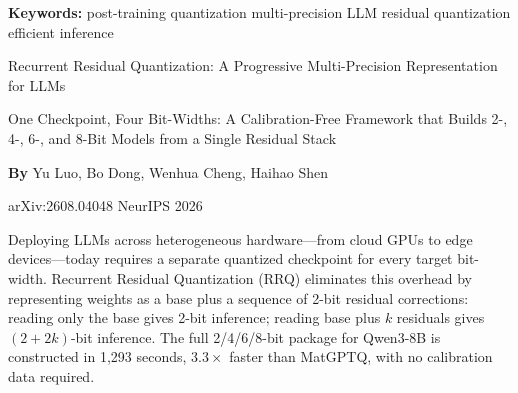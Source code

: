 \documentclass[10pt,twocolumn]{article}
\begin{document}
\setlength{\parindent}{0pt}
\setlength{\parskip}{4pt}

{\small\color{keywordgray}\textbf{Keywords:}
  post-training quantization \textbullet{}
  multi-precision LLM \textbullet{}
  residual quantization \textbullet{}
  efficient inference}\par\vspace{4pt}

{\LARGE\bfseries\raggedright
  Recurrent Residual Quantization: A Progressive
  Multi-Precision Representation for LLMs}\par\vspace{4pt}

{\large\itshape\raggedright
  One Checkpoint, Four Bit-Widths: A Calibration-Free
  Framework that Builds 2-, 4-, 6-, and 8-Bit Models
  from a Single Residual Stack}\par\vspace{6pt}

{\small\textbf{By} Yu Luo, Bo Dong, Wenhua Cheng, Haihao Shen}\par\vspace{2pt}

{\small\color{keywordgray}arXiv:2608.04048 \textbullet{} NeurIPS 2026}
\par\vspace{2pt}\noindent{\color{rulered}\rule{\columnwidth}{0.6pt}}\vspace{6pt}

Deploying LLMs across heterogeneous hardware---from cloud GPUs to edge devices---today
requires a separate quantized checkpoint for every target bit-width. Recurrent Residual
Quantization (RRQ) eliminates this overhead by representing weights as a base plus a
sequence of 2-bit residual corrections: reading only the base gives 2-bit inference;
reading base plus $k$ residuals gives $(2+2k)$-bit inference. The full 2/4/6/8-bit
package for Qwen3-8B is constructed in 1{,}293 seconds, $3.3\times$ faster than
MatGPTQ, with no calibration data required.
\end{document}
